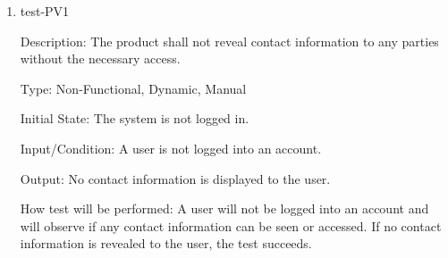 \documentclass[12pt, titlepage]{article}
\begin{document}
\begin{enumerate}





  \item{test-PV1\\}
  
  Description: The product shall not reveal contact information
  to any parties without the necessary access.

  Type: Non-Functional, Dynamic, Manual

  Initial State: The system is not logged in.

  Input/Condition: A user is not logged into an account.

  Output: No contact information is displayed to the user.

  How test will be performed: A user will not be logged into an account and will
  observe if any contact information can be seen or accessed. If no contact information
  is revealed to the user, the test succeeds.







\end{enumerate}

\end{document}
